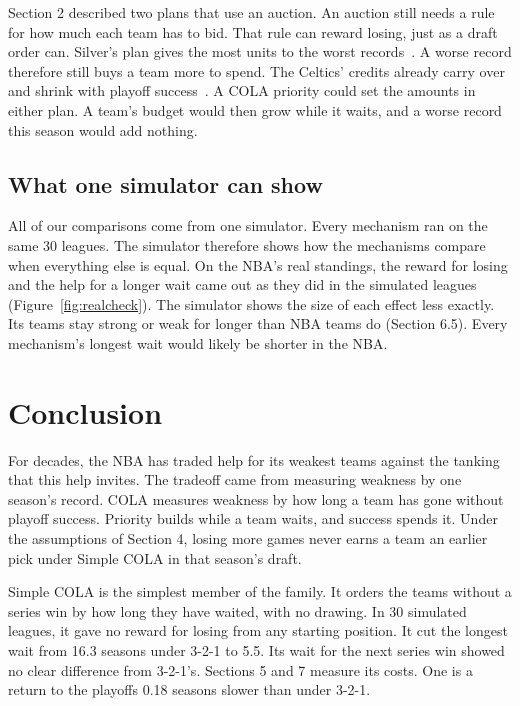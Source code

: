 \documentclass[11pt,letterpaper]{article}
\begin{document}
Section 2 described two plans that use an auction. An auction still needs a rule for how much each team has to bid. That rule can reward losing, just as a draft order can. Silver's plan gives the most units to the worst records~\cite{silver2026arc}. A worse record therefore still buys a team more to spend. The Celtics' credits already carry over and shrink with playoff success~\cite{quinn2026credits}. A COLA priority could set the amounts in either plan. A team's budget would then grow while it waits, and a worse record this season would add nothing.

\subsection{What one simulator can show}

All of our comparisons come from one simulator. Every mechanism ran on the same 30 leagues. The simulator therefore shows how the mechanisms compare when everything else is equal. On the NBA's real standings, the reward for losing and the help for a longer wait came out as they did in the simulated leagues (Figure~\ref{fig:realcheck}). The simulator shows the size of each effect less exactly. Its teams stay strong or weak for longer than NBA teams do (Section 6.5). Every mechanism's longest wait would likely be shorter in the NBA.

\section{Conclusion}

For decades, the NBA has traded help for its weakest teams against the tanking that this help invites. The tradeoff came from measuring weakness by one season's record. COLA measures weakness by how long a team has gone without playoff success. Priority builds while a team waits, and success spends it. Under the assumptions of Section 4, losing more games never earns a team an earlier pick under Simple COLA in that season's draft.

Simple COLA is the simplest member of the family. It orders the teams without a series win by how long they have waited, with no drawing. In 30 simulated leagues, it gave no reward for losing from any starting position. It cut the longest wait from 16.3 seasons under 3-2-1 to 5.5. Its wait for the next series win showed no clear difference from 3-2-1's. Sections 5 and 7 measure its costs. One is a return to the playoffs 0.18 seasons slower than under 3-2-1.
\end{document}
